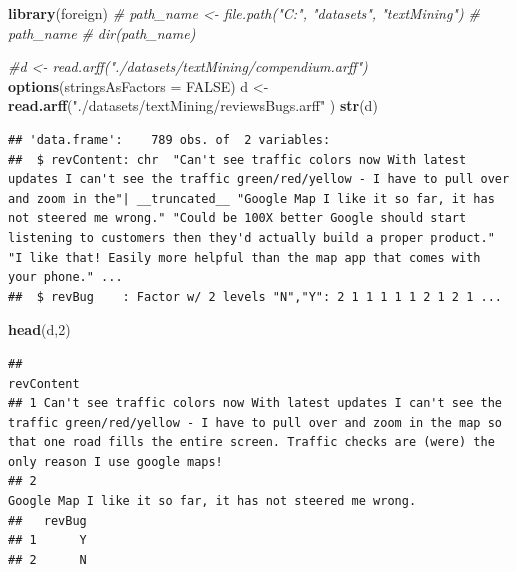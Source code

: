 \documentclass[]{book}
\newenvironment{Shaded}{\begin{snugshade}}{\end{snugshade}}
\newcommand{\KeywordTok}[1]{\textcolor[rgb]{0.13,0.29,0.53}{\textbf{{#1}}}}
\newcommand{\DataTypeTok}[1]{\textcolor[rgb]{0.13,0.29,0.53}{{#1}}}
\newcommand{\DecValTok}[1]{\textcolor[rgb]{0.00,0.00,0.81}{{#1}}}
\newcommand{\StringTok}[1]{\textcolor[rgb]{0.31,0.60,0.02}{{#1}}}
\newcommand{\CommentTok}[1]{\textcolor[rgb]{0.56,0.35,0.01}{\textit{{#1}}}}
\newcommand{\OtherTok}[1]{\textcolor[rgb]{0.56,0.35,0.01}{{#1}}}
\newcommand{\NormalTok}[1]{{#1}}
\begin{document}
\begin{Shaded}
\begin{Highlighting}[]
\KeywordTok{library}\NormalTok{(foreign)}
\CommentTok{# path_name <- file.path("C:", "datasets", "textMining")}
\CommentTok{# path_name}
\CommentTok{# dir(path_name)}

\CommentTok{#d <- read.arff("./datasets/textMining/compendium.arff")}
\KeywordTok{options}\NormalTok{(}\DataTypeTok{stringsAsFactors =} \OtherTok{FALSE}\NormalTok{)}
\NormalTok{d <-}\StringTok{ }\KeywordTok{read.arff}\NormalTok{(}\StringTok{"./datasets/textMining/reviewsBugs.arff"} \NormalTok{)}
\KeywordTok{str}\NormalTok{(d)}
\end{Highlighting}
\end{Shaded}

\begin{verbatim}
## 'data.frame':    789 obs. of  2 variables:
##  $ revContent: chr  "Can't see traffic colors now With latest updates I can't see the traffic green/red/yellow - I have to pull over and zoom in the"| __truncated__ "Google Map I like it so far, it has not steered me wrong." "Could be 100X better Google should start listening to customers then they'd actually build a proper product." "I like that! Easily more helpful than the map app that comes with your phone." ...
##  $ revBug    : Factor w/ 2 levels "N","Y": 2 1 1 1 1 1 2 1 2 1 ...
\end{verbatim}

\begin{Shaded}
\begin{Highlighting}[]
\KeywordTok{head}\NormalTok{(d,}\DecValTok{2}\NormalTok{)}
\end{Highlighting}
\end{Shaded}

\begin{verbatim}
##                                                                                                                                                                                                                                   revContent
## 1 Can't see traffic colors now With latest updates I can't see the traffic green/red/yellow - I have to pull over and zoom in the map so that one road fills the entire screen. Traffic checks are (were) the only reason I use google maps!
## 2                                                                                                                                                                                  Google Map I like it so far, it has not steered me wrong.
##   revBug
## 1      Y
## 2      N
\end{verbatim}
\end{document}

